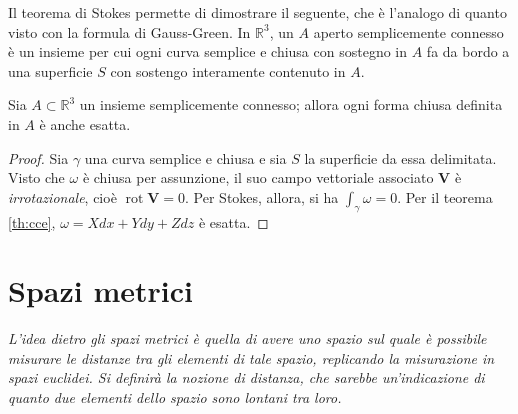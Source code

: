 \documentclass[11pt, a4paper]{scrartcl}
\theoremstyle{definition}
\numberwithin{esempio}{section}
\theoremstyle{definition}
\numberwithin{obs}{section}
\numberwithin{nota}{section}
\numberwithin{equation}{subsection}
\begin{document}
Il teorema di Stokes permette di dimostrare il seguente, che \`e l'analogo di quanto visto con la formula di Gauss-Green.
In $\mathbb{R}^3$, un $A$ aperto semplicemente connesso \`e un insieme per cui ogni curva semplice e chiusa con sostegno in $A$ fa da bordo a una superficie $S$ con sostengo interamente contenuto in $A$.
\begin{teorema}
	{}{}
Sia $A\subset \mathbb{R}^3$ un insieme semplicemente connesso; allora ogni forma chiusa definita in $A$ \`e anche esatta.
	\begin{proof}
	Sia $\gamma$ una curva semplice e chiusa e sia $S$ la superficie da essa delimitata.
	Visto che $\omega$ \`e chiusa per assunzione, il suo campo vettoriale associato $\mathbf{V} $ \`e \textit{irrotazionale}, cio\`e $\operatorname{rot} \mathbf{V} = 0$. 
	Per Stokes, allora, si ha $\int_{\gamma} \omega = 0$. 
	Per il teorema \ref{th:cce}, $\omega = Xdx + Ydy + Zdz$ \`e esatta.
	\end{proof}
\end{teorema}
\newpage
\section{Spazi metrici}
\begin{center}
	\textit{
L'idea dietro gli spazi metrici \`e quella di avere uno spazio sul quale \`e possibile misurare le distanze tra gli elementi di tale spazio, replicando la misurazione in spazi euclidei.
Si definir\`a la nozione di distanza, che sarebbe un'indicazione di quanto due elementi dello spazio sono lontani tra loro.}
\end{center}
\end{document}
